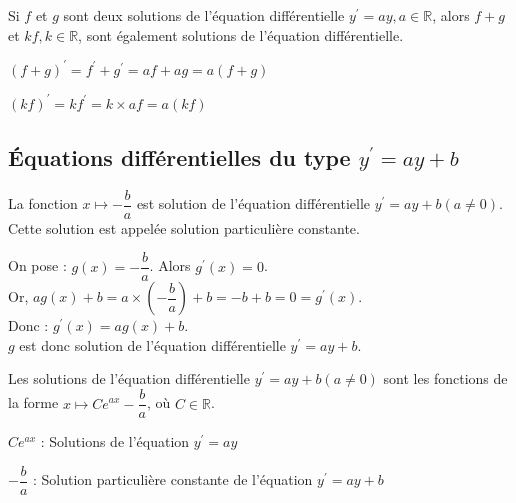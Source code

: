 \begin{bprop}
	Si $f$ et $g$ sont deux solutions de l'équation différentielle $y^{\prime}=a y, a \in \mathbb{R}$, alors $f+g$ et $k f, k \in \mathbb{R}$, sont également solutions de l'équation différentielle.
\end{bprop}

\begin{bdemo}
	\begin{itemDem}
		\item $(f+g)^{\prime}=f^{\prime}+g^{\prime}=a f+a g=a(f+g)$\\
		\item $(k f)^{\prime}=k f^{\prime}=k \times a f=a(k f)$\\
	\end{itemDem}
\end{bdemo}

\subsection{Équations différentielles du type $y^{\prime}=a y+b$}

\begin{bprop}
La fonction $x \mapsto-\dfrac{b}{a}$ est solution de l'équation différentielle $y^{\prime}=a y+b(a \neq 0)$. Cette solution est appelée solution particulière constante.
\end{bprop}

\begin{bdemo}
	On pose : $g(x)=-\dfrac{b}{a}$. Alors $g^{\prime}(x)=0$.\\
	Or, $a g(x)+b=a \times\left(-\dfrac{b}{a}\right)+b=-b+b=0=g^{\prime}(x)$.\\
	Donc : $g^{\prime}(x)=a g(x)+b$.\\
	$g$ est donc solution de l'équation différentielle $y^{\prime}=a y+b$.
\end{bdemo}

\begin{bprop}
	Les solutions de l'équation différentielle $y^{\prime}=a y+b(a \neq 0)$ sont les fonctions de la forme $x \longmapsto C e^{a x}-\dfrac{b}{a}$, où $C \in \mathbb{R}$.
	
	$C e^{a x}$ : Solutions de l'équation $y^{\prime}=a y$
	
	$-\dfrac{b}{a}$ : Solution particulière constante de l'équation $y^{\prime}=a y+b$
\end{bprop}

